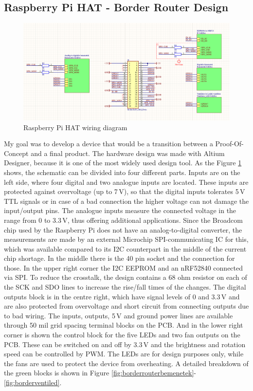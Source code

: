\subsection{Raspberry Pi HAT - Border Router Design}
\begin{figure}[!htb]
    \centering
    \includegraphics[width=\textwidth]{img/rpischematics.png}
    \caption{Raspberry Pi HAT wiring diagram}
    \label{fig:Schematics}
\end{figure}
\noindent
My goal was to develop a device that would be a transition between a Proof-Of-Concept and a final product. The hardware design was made with Altium Designer, because it is one of the most widely used design tool. As the Figure \ref{fig:Schematics} shows, the schematic can be divided into four different parts. Inputs are on the left side, where four digital and two analogue inputs are located. These inputs are protected against overvoltage (up to 7\,\si{\volt}), so that the digital inputs tolerates 5\,\si{\volt} TTL signals or in case of a bad connection the higher voltage can not damage the input/output pins. The analogue inputs measure the connected voltage in the range from 0 to 3.3\,\si{\volt}, thus offering additional applications. Since the Broadcom chip used by the Raspberry Pi does not have an analog-to-digital converter, the measurements are made by an external Microchip SPI-communicating IC for this, which was available compared to its I2C counterpart in the middle of the current chip shortage. In the middle there is the 40 pin socket and the connection for those. In the upper right corner the I2C EEPROM and an nRF52840 connected via SPI. To reduce the crosstalk, the design contains a 68 ohm resistor on each of the SCK and SDO lines to increase the rise/fall times of the changes. The digital outputs block is in the centre right, which have signal levels of 0 and 3.3\,\si{\volt} and are also protected from overvoltage and short circuit from connecting outputs due to bad wiring. The inputs, outputs, 5\,\si{\volt} and ground power lines are available through 50 mil grid spacing terminal blocks on the PCB. And in the lower right corner is shown the control block for the five LEDs and two fan outputs on the PCB. These can be switched on and off by 3.3\,\si{\volt} and the brightness and rotation speed can be controlled by PWM. The LEDs are for design purposes only, while the fans are used to protect the device from overheating. A detailed breakdown of the green blocks is shown in Figure \ref{fig:borderrouterbemenetek}-\ref{fig:borderventiled}.
